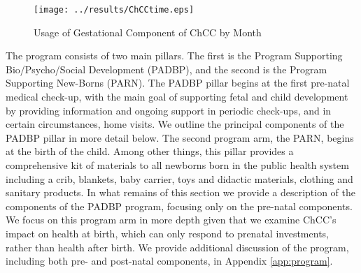 \documentclass[12pt]{article}
\begin{document}
\begin{spacing}{1.4}
\begin{figure}[htpb!]
  \begin{center}
    \centering
    \caption{Usage of Gestational Component of ChCC by Month}
    \texttt{[image: ../results/ChCCtime.eps]}
    \label{fig:coverage}
  \end{center}
  \vspace{-5mm}
\end{figure}


The program consists of two main pillars.  The first is the Program
Supporting Bio/Psycho/Social Development (PADBP), and the second
is the Program Supporting New-Borns (PARN).  The PADBP pillar begins
at the first pre-natal medical check-up, with the main goal of
supporting fetal and child development by providing information and
ongoing support in periodic check-ups, and in certain circumstances,
home visits.  We outline the principal components of the PADBP pillar
in more detail below.  The second program arm, the PARN, begins at the
birth of the child.  Among other things, this pillar provides a
comprehensive kit of materials to all newborns born in the public
health system including a crib, blankets, baby carrier, toys and
didactic materials, clothing and sanitary products.  In what remains
of this section we provide a description of the components of the PADBP
program, focusing only on the pre-natal components.  We focus on this
program arm in more depth given that we examine ChCC's impact on
health at birth, which can only respond to prenatal investments, rather
than health after birth. We provide additional discussion of the program,
including both pre- and post-natal components, in Appendix
\ref{app:program}.



\end{spacing}
\end{document}
